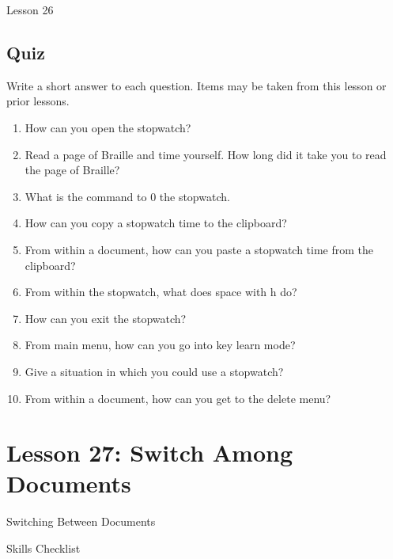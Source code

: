 \documentclass[10pt,letterpaper,twoside]{report}
\begin{document}
{{{{\clearpage

\newpage
Lesson 26

\subsection{Quiz}



Write a short answer to each question.  Items may be taken from this lesson or prior lessons.



\begin{enumerate}
	\item How can you open the stopwatch?
	      
	\item Read a page of Braille and time yourself.  How long did it take you to read the page of Braille?
	      
	\item What is the command to 0 the stopwatch.
	      
	\item How can you copy a stopwatch time to the clipboard?
	      
	\item From within a document, how can you paste a stopwatch time from the clipboard?
	      
	\item From within the stopwatch, what does space with h do?
	      
	\item How can you exit the stopwatch?
	      
	\item From main menu, how can you go into key learn mode?
	      
	\item Give a situation in which you could use a stopwatch?
	      
	\item From within a document, how can you get to the delete menu?
\end{enumerate}



\section*{Lesson 27: Switch Among Documents}
Switching Between Documents



Skills Checklist



}}}}
\end{document}

